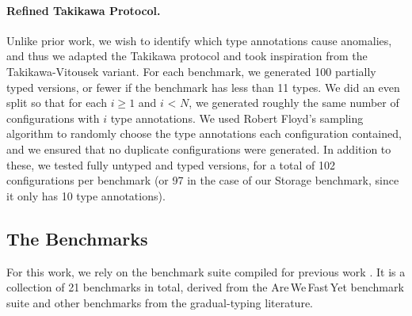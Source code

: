 \documentclass[sigplan,screen]{acmart}
\def\AWFY{Are\,We\,Fast\,Yet\xspace}
\begin{document}
\paragraph{Refined Takikawa Protocol.}
Unlike prior work, we wish to identify which type annotations cause anomalies,
and thus we adapted the Takikawa protocol
and took inspiration from the Takikawa-Vitousek variant.
For each benchmark, we generated 100 partially typed versions,
or fewer if the benchmark has less than 11 types.
We did an even split so that for each $i \ge 1$ and $i$ < $N$, we generated roughly the same number of configurations with $i$ type annotations. We used Robert Floyd's sampling algorithm \cite{Bentley:1987:PPS:30401.315746} to randomly choose the type annotations each configuration contained, and we ensured that no duplicate configurations were generated. In addition to these, we tested fully untyped and typed versions, for a total of 102 configurations per benchmark (or 97 in the case of our Storage benchmark, since it only has 10 type annotations).

\subsection{The Benchmarks}

For this work, we rely on the benchmark suite compiled for previous work
\cite{roberts-and-co-ecoop-2019}.
It is a collection of 21 benchmarks in total,
derived from the \AWFY
benchmark suite \cite{Marr2016} and other benchmarks
from the gradual-typing literature.
\end{document}
